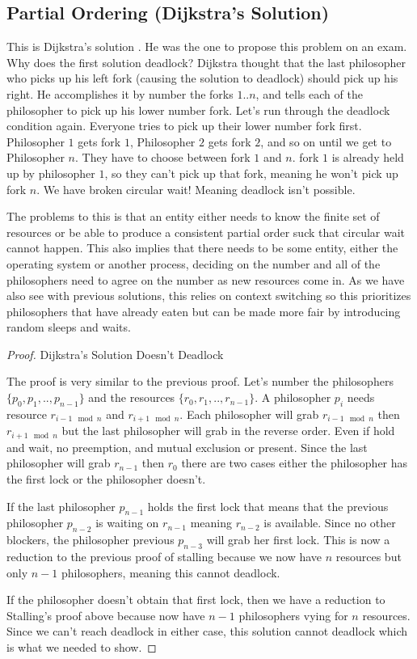 \subsection{Partial Ordering (Dijkstra's Solution)}

This is Dijkstra's solution \cite[P. 20]{EWD:EWD310}. He was the one to propose this problem on an exam.
Why does the first solution deadlock? Dijkstra thought that the last philosopher who picks up his left fork (causing the solution to deadlock) should pick up his right.
He accomplishes it by number the forks $1..n$, and tells each of the philosopher to pick up his lower number fork.
Let's run through the deadlock condition again.
Everyone tries to pick up their lower number fork first.
Philosopher $1$ gets fork $1$, Philosopher $2$ gets fork $2$, and so on until we get to Philosopher $n$.
They have to choose between fork $1$ and $n$.
fork $1$ is already held up by philosopher $1$, so they can't pick up that fork, meaning he won't pick up fork $n$.
We have broken circular wait! Meaning deadlock isn't possible.

The problems to this is that an entity either needs to know the finite set of resources or be able to produce a consistent partial order suck that circular wait cannot happen.
This also implies that there needs to be some entity, either the operating system or another process, deciding on the number and all of the philosophers need to agree on the number as new resources come in.
As we have also see with previous solutions, this relies on context switching so this prioritizes philosophers that have already eaten but can be made more fair by introducing random sleeps and waits.

\begin{proof} Dijkstra's Solution Doesn't Deadlock

The proof is very similar to the previous proof.
Let's number the philosophers $\{p_0, p_1, .., p_{n-1}\}$ and the resources $\{r_0, r_1, .., r_{n-1}\}$.
A philosopher $p_i$ needs resource $r_{i-1 \mod n}$ and $r_{i + 1 \mod n}$.
Each philosopher will grab $r_{i-1 \mod n}$ then $r_{i + 1 \mod n}$ but the last philosopher will grab in the reverse order.
Even if hold and wait, no preemption, and mutual exclusion or present.
Since the last philosopher will grab $r_{n-1}$ then $r_0$ there are two cases either the philosopher has the first lock or the philosopher doesn't.

If the last philosopher $p_{n-1}$ holds the first lock that means that the previous philosopher $p_{n-2}$ is waiting on $r_{n-1}$ meaning $r_{n-2}$ is available.
Since no other blockers, the philosopher previous $p_{n-3}$ will grab her first lock.
This is now a reduction to the previous proof of stalling because we now have $n$ resources but only $n-1$ philosophers, meaning this cannot deadlock.

If the philosopher doesn't obtain that first lock, then we have a reduction to Stalling's proof above because now have $n-1$ philosophers vying for $n$ resources.
Since we can't reach deadlock in either case, this solution cannot deadlock which is what we needed to show.

\end{proof}

